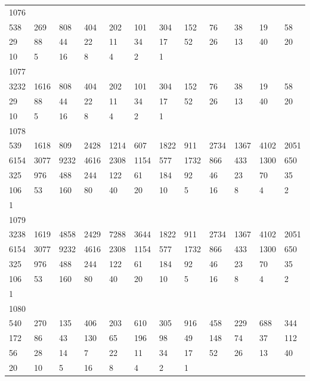 \begin{longtable}{llllllllllll}
1076&&&&&&&&&&&\\
538& 269& 808& 404& 202& 101& 304& 152& 76& 38& 19& 58\\
29& 88& 44& 22& 11& 34& 17& 52& 26& 13& 40& 20\\
10& 5& 16& 8& 4& 2& 1& \\

1077&&&&&&&&&&&\\
3232& 1616& 808& 404& 202& 101& 304& 152& 76& 38& 19& 58\\
29& 88& 44& 22& 11& 34& 17& 52& 26& 13& 40& 20\\
10& 5& 16& 8& 4& 2& 1& \\

1078&&&&&&&&&&&\\
539& 1618& 809& 2428& 1214& 607& 1822& 911& 2734& 1367& 4102& 2051\\
6154& 3077& 9232& 4616& 2308& 1154& 577& 1732& 866& 433& 1300& 650\\
325& 976& 488& 244& 122& 61& 184& 92& 46& 23& 70& 35\\
106& 53& 160& 80& 40& 20& 10& 5& 16& 8& 4& 2\\
1& \\

1079&&&&&&&&&&&\\
3238& 1619& 4858& 2429& 7288& 3644& 1822& 911& 2734& 1367& 4102& 2051\\
6154& 3077& 9232& 4616& 2308& 1154& 577& 1732& 866& 433& 1300& 650\\
325& 976& 488& 244& 122& 61& 184& 92& 46& 23& 70& 35\\
106& 53& 160& 80& 40& 20& 10& 5& 16& 8& 4& 2\\
1& \\

1080&&&&&&&&&&&\\
540& 270& 135& 406& 203& 610& 305& 916& 458& 229& 688& 344\\
172& 86& 43& 130& 65& 196& 98& 49& 148& 74& 37& 112\\
56& 28& 14& 7& 22& 11& 34& 17& 52& 26& 13& 40\\
20& 10& 5& 16& 8& 4& 2& 1& \\


\end{longtable}
